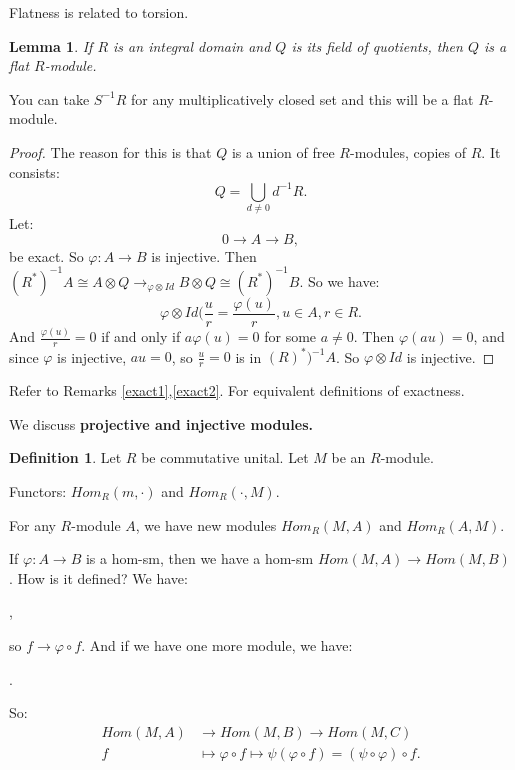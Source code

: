 \documentclass[12pt]{amsbook}
\theoremstyle{plain}
\numberwithin{section}{chapter}
\numberwithin{equation}{chapter}
\newtheorem{lem}[theorem]{Lemma}
\theoremstyle{definition}
\newtheorem{Def}[theorem]{Definition}
\theoremstyle{remark}
\newcommand{\bee}{\begin{equation}\begin{aligned}}
\newcommand{\eee}{\end{aligned}\end{equation}}
\newcommand{\fracc}{\frac}
\newcommand{\tens}{\otimes}
\renewcommand{\phi}{\varphi}
\begin{document}
Flatness is related to torsion. 

\begin{lem}\label{lem10.151}
If $R$ is an integral domain and $Q$ is its field of quotients, then $Q$ is a flat $R$-module. 
\end{lem}

You can take $S^{-1}R$ for any multiplicatively closed set and this will be a flat $R$-module.

\begin{proof}
The reason for this is that $Q$ is a union of free $R$-modules, copies of $R$. It consists:
$$
Q = \bigcup_{d \neq 0}d^{-1}R.
$$
Let:
$$
0 \to A \to B,
$$
be exact. So $\phi:A \to B$ is injective. Then $(R^*)^{-1}A \cong A \tens Q \to_{\phi \tens Id} B \tens Q \cong (R^*)^{-1}B$. So we have:
$$
\phi \tens Id(\fracc{u}{r} = \fracc{\phi(u)}{r}, u \in A,r \in R.
$$
And $\fracc{\phi(u)}{r}=0$ if and only if $a \phi(u) = 0$ for some $a \neq 0$. Then $\phi(au) = 0$, and since $\phi$ is injective, $au = 0$, so $\fracc{u}{r} = 0$ is in $(R)^*)^{-1}A$. So $\phi \tens Id$ is injective. 
\end{proof}


Refer to Remarks \ref{exact1},\ref{exact2}. For equivalent definitions of exactness. 

We discuss \textbf{projective and injective modules.} 

\begin{Def}
Let $R$ be commutative unital. Let $M$ be an $R$-module. 

Functors: $Hom_R(m,\cdot)$ and $Hom_R(\cdot,M)$. 

For any $R$-module $A$, we have new modules $Hom_R(M,A)$ and $Hom_R(A,M)$. 
\end{Def}

If $\phi:A \to B$ is a hom-sm, then we have a hom-sm $Hom(M,A) \to Hom(M,B)$. How is it defined? We have:
\begin{center}
,
\end{center}
so $f \to \phi \circ f$. And if we have one more module, we have:
\begin{center}
.
\end{center}
So:
\bee
Hom(M,A) &\to Hom(M,B) \to Hom(M,C)\\
f & \mapsto \phi \circ f \mapsto \psi(\phi \circ f) = (\psi \circ \phi) \circ f.
\eee
\end{document}
